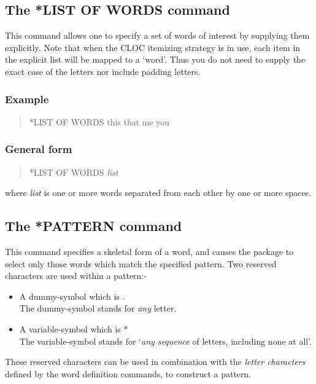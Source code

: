 \subsection{The *LIST OF WORDS command}
This command allows one to specify a set of words of interest by supplying
them explicitly.
Note that when the CLOC itemizing strategy
is in use, each item in the explicit list will be mapped to a `word'. Thus you
do not need to supply the exact case of the letters nor include padding
letters.

\subsubsection{Example}
\begin{quote}
*LIST OF WORDS      this that me you
\end{quote}

\subsubsection{General form}
\begin{quote}
*LIST OF WORDS      {\em list}
\end{quote}
where {\em list} is one or more words separated from each other by one or
more spaces.

\subsection{The *PATTERN command}
This command specifies a skeletal form of a word, and causes the package
to select only those words which match the specified pattern.  Two
reserved characters are used within a pattern:-
\begin{itemize}
\item A dummy-symbol      which is .\\
    The dummy-symbol stands for {\em any} letter.
\item A variable-symbol   which is *\\
    The variable-symbol stands for `{\em any sequence} of letters, including
none at all'.
\end{itemize}
These reserved characters can be used in combination with the {\em letter
characters} defined by the word definition commands, to construct a pattern.

